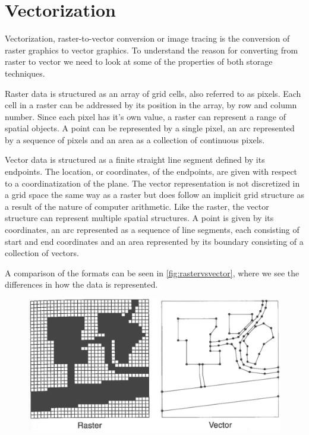\chapter{Vectorization}\label{chp:vectorization}
Vectorization, raster-to-vector conversion or image tracing is the conversion of raster graphics to vector graphics. To understand the reason for converting from raster to vector we need to look at some of the properties of both storage techniques.

Raster data is structured as an array of grid cells, also referred to as pixels. Each cell in a raster can be addressed by its position in the array, by row and column number. Since each pixel has it's own value, a raster can represent a range of spatial objects. A point can be represented by a single pixel, an arc represented by a sequence of pixels and an area as a collection of continuous pixels. 

Vector data is structured as a finite straight line segment defined by its endpoints. The location, or coordinates, of the endpoints, are given with respect to a coordinatization of the plane. The vector representation is not discretized in a grid space the same way as a raster but does follow an implicit grid structure as a result of the nature of computer arithmetic. Like the raster, the vector structure can represent multiple spatial structures. A point is given by its coordinates, an arc represented as a sequence of line segments, each consisting of start and end coordinates and an area represented by its boundary consisting of a collection of vectors.

A comparison of the formats can be seen in \autoref{fig:rastervsvector}, where we see the differences in how the data is represented.

\begin{figure}[H]
	\centering
	\includegraphics[width=0.8\linewidth]{fig/rastervector.png}
	\label{fig:rastervsvector}
\end{figure}

